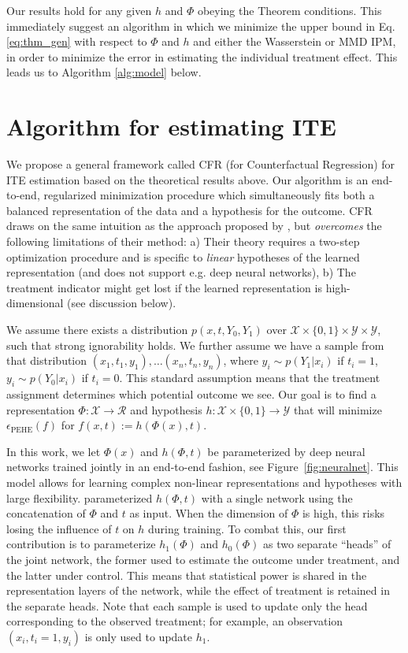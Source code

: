 \documentclass{article}
\def\cX{\mathcal X}
\def\cY{\mathcal Y}
\def\cR{\mathcal{R}}
\def \epehe{\epsilon_{\text{PEHE}}}
\begin{document}
Our results hold for any given $h$ and $\Phi$ obeying the Theorem conditions. This immediately suggest an algorithm in which we minimize the upper bound in Eq. \eqref{eq:thm_gen} with respect to $\Phi$ and $h$ and either the Wasserstein or MMD IPM, in order to minimize the error in estimating the individual treatment effect. This leads us to Algorithm \ref{alg:model} below.
 
\section{Algorithm for estimating ITE}\label{sec:model}

We propose a general framework called CFR (for Counterfactual Regression) for ITE estimation based on the theoretical results above. Our algorithm is an end-to-end, regularized minimization procedure which simultaneously fits both a balanced representation of the data and a hypothesis for the outcome.
CFR draws on the same intuition as the approach proposed by  \citet{johansson2016counterfactual}, but \emph{overcomes} the following limitations of their method: a) Their theory requires a two-step optimization procedure and is specific to \emph{linear} hypotheses of the learned representation (and does not support e.g. deep neural networks), b) The treatment indicator might get lost if the learned representation is high-dimensional (see discussion below).



We assume there exists a distribution $p(x,t,Y_0,Y_1)$ over $\cX \times \{0,1\} \times \cY \times \cY$, such that strong ignorability holds. We further assume we have a sample from that distribution $(x_1,t_1,y_1), \dots (x_n,t_n,y_n)$, where $y_i \sim p(Y_1|x_i)$ if $t_i=1$, $y_i \sim p(Y_0|x_i)$ if $t_i=0$. This standard assumption means that the treatment assignment determines which potential outcome we see. Our goal is to find a representation $\Phi : \cX \rightarrow \cR$ and hypothesis $h:  \cX \times \{0,1\} \rightarrow \cY$ that will minimize $\epehe(f)$ for $f(x,t):=h(\Phi(x),t)$.

In this work, we let $\Phi(x)$ and $h(\Phi,t)$ be parameterized by deep neural networks trained jointly in an end-to-end fashion, see Figure~\ref{fig:neuralnet}. This model allows for learning complex non-linear representations and hypotheses with large flexibility. \citet{johansson2016counterfactual} parameterized $h(\Phi,t)$ with a single network using the concatenation of $\Phi$ and $t$ as input. When the dimension of $\Phi$ is high, this risks losing the influence of $t$ on $h$ during training. To combat this, our first contribution is to parameterize $h_1(\Phi)$ and $h_0(\Phi)$ as two separate ``heads'' of the joint network, the former used to estimate the outcome under treatment, and the latter under control. This means that statistical power is shared in the representation layers of the network, while the effect of treatment is retained in the separate heads. Note that each sample is used to update only the head corresponding to the observed treatment; for example, an observation $(x_i, t_i=1, y_i)$ is only used to update $h_1$.
\end{document}
